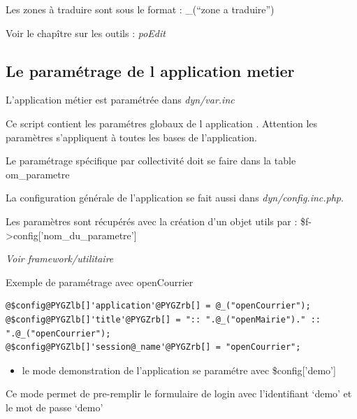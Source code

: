 \documentclass[letterpaper,10pt,french]{manual}
\begin{document}
Les zones à traduire sont sous le format : \_(``zone a traduire'')

Voir le chapître sur les outils : \emph{poEdit}


\subsection{Le paramétrage de l application metier}

L'application métier est paramétrée dans \emph{dyn/var.inc}

Ce script contient les paramétres globaux de l application .
Attention les paramètres s'appliquent à toutes les bases de l'application.

Le paramétrage spécifique par collectivité doit se faire dans la table om\_parametre

La configuration générale de l'application se fait aussi dans \emph{dyn/config.inc.php}.

Les paramètres sont récupérés avec la création d'un objet utils par :
\$f-\textgreater{}config{[}'nom\_du\_parametre'{]}

\emph{Voir framework/utilitaire}

Exemple de paramétrage avec openCourrier

\begin{Verbatim}[commandchars=@\[\]]
@$config@PYGZlb[]'application'@PYGZrb[] = @_("openCourrier");
@$config@PYGZlb[]'title'@PYGZrb[] = ":: ".@_("openMairie")." :: ".@_("openCourrier");
@$config@PYGZlb[]'session@_name'@PYGZrb[] = "openCourrier";
\end{Verbatim}
\begin{itemize}
\item {} 
le mode demonstration de l'application se paramétre avec \$config{[}'demo'{]}

\end{itemize}

Ce mode permet de pre-remplir le formulaire de login avec l'identifiant `demo' et le mot de passe `demo'
\end{document}
